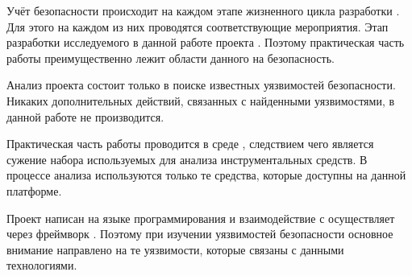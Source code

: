 %
Учёт безопасности происходит на каждом этапе жизненного цикла разработки 
 . 
%
Для этого на каждом из них проводятся соответствующие мероприятия. 
%
Этап разработки исследуемого в данной работе проекта   
. 
%
Поэтому практическая часть работы преимущественно лежит области  данного 
 на безопасность.

%
Анализ проекта  состоит только в поиске известных уязвимостей безопасности.
%
Никаких дополнительных действий, связанных с найденными уязвимостями, в данной работе не производится.

%
Практическая часть работы проводится в среде  , следствием чего является сужение набора используемых для анализа инструментальных средств.
%
В процессе анализа используются только те средства, которые доступны на данной платформе.

%
Проект  написан на языке программирования   и взаимодействие 
с  осуществляет через фреймворк  .
%
Поэтому при изучении уязвимостей безопасности  основное внимание направлено на те уязвимости, которые связаны с данными технологиями.